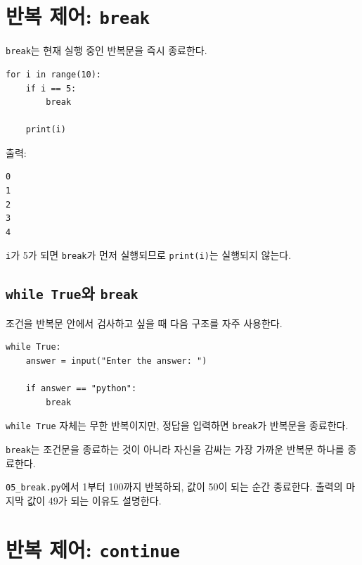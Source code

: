\documentclass[11pt,a4paper]{article}
\begin{document}
\section{반복 제어: \texttt{break}}

\texttt{break}는 현재 실행 중인 반복문을 즉시 종료한다.

\begin{lstlisting}
for i in range(10):
    if i == 5:
        break

    print(i)
\end{lstlisting}

출력:

\begin{verbatim}
0
1
2
3
4
\end{verbatim}

\texttt{i}가 5가 되면 \texttt{break}가 먼저 실행되므로 \texttt{print(i)}는 실행되지 않는다.

\subsection{\texttt{while True}와 \texttt{break}}

조건을 반복문 안에서 검사하고 싶을 때 다음 구조를 자주 사용한다.

\begin{lstlisting}
while True:
    answer = input("Enter the answer: ")

    if answer == "python":
        break
\end{lstlisting}

\texttt{while True} 자체는 무한 반복이지만, 정답을 입력하면 \texttt{break}가 반복문을 종료한다.

\begin{importantbox}
\texttt{break}는 조건문을 종료하는 것이 아니라 자신을 감싸는 가장 가까운 반복문 하나를 종료한다.
\end{importantbox}

\begin{practicebox}
\texttt{05\_break.py}에서 1부터 100까지 반복하되, 값이 50이 되는 순간 종료한다. 출력의 마지막 값이 49가 되는 이유도 설명한다.
\end{practicebox}

\section{반복 제어: \texttt{continue}}
\end{document}
